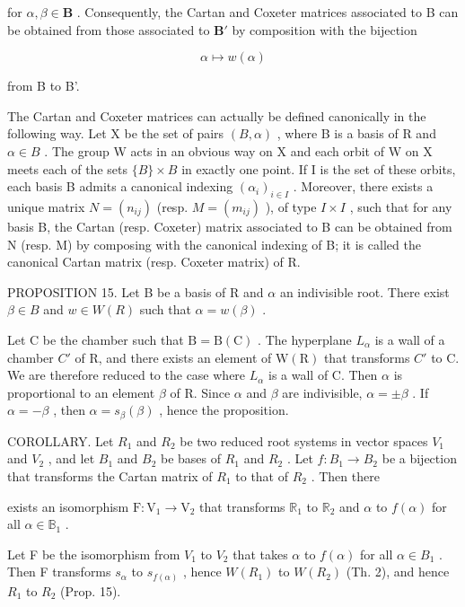 for \(\alpha, \beta \in \mathbf{B}\) . Consequently, the Cartan and Coxeter matrices associated to B can be obtained from those associated to \(\mathbf{B}'\) by composition with the bijection

\[
\alpha \mapsto w (\alpha)
\]

from B to B'.

The Cartan and Coxeter matrices can actually be defined canonically in the following way. Let X be the set of pairs \((B, \alpha)\) , where B is a basis of R and \(\alpha \in B\) . The group W acts in an obvious way on X and each orbit of W on X meets each of the sets \(\{B\} \times B\) in exactly one point. If I is the set of these orbits, each basis B admits a canonical indexing \((\alpha_{i})_{i \in I}\) . Moreover, there exists a unique matrix \(N = (n_{ij})\) (resp. \(M = (m_{ij})\) ), of type \(I \times I\) , such that for any basis B, the Cartan (resp. Coxeter) matrix associated to B can be obtained from N (resp. M) by composing with the canonical indexing of B; it is called the canonical Cartan matrix (resp. Coxeter matrix) of R.

PROPOSITION 15. Let B be a basis of R and \(\alpha\) an indivisible root. There exist \(\beta \in B\) and \(w \in W(R)\) such that \(\alpha = w(\beta)\) .

Let C be the chamber such that \(\mathrm{B} = \mathrm{B}(\mathrm{C})\) . The hyperplane \(L_{\alpha}\) is a wall of a chamber \(C'\) of R, and there exists an element of \(\mathrm{W}(\mathrm{R})\) that transforms \(C'\) to C. We are therefore reduced to the case where \(L_{\alpha}\) is a wall of C. Then \(\alpha\) is proportional to an element \(\beta\) of R. Since \(\alpha\) and \(\beta\) are indivisible, \(\alpha = \pm\beta\) . If \(\alpha = -\beta\) , then \(\alpha = s_{\beta}(\beta)\) , hence the proposition.

COROLLARY. Let \(R_{1}\) and \(R_{2}\) be two reduced root systems in vector spaces \(V_{1}\) and \(V_{2}\) , and let \(B_{1}\) and \(B_{2}\) be bases of \(R_{1}\) and \(R_{2}\) . Let \(f: B_{1} \to B_{2}\) be a bijection that transforms the Cartan matrix of \(R_{1}\) to that of \(R_{2}\) . Then there

exists an isomorphism \(\mathrm{F}: \mathrm{V}_1 \to \mathrm{V}_2\) that transforms \(\mathbb{R}_1\) to \(\mathbb{R}_2\) and \(\alpha\) to \(f(\alpha)\) for all \(\alpha \in \mathbb{B}_1\) .

Let F be the isomorphism from \(V_{1}\) to \(V_{2}\) that takes \(\alpha\) to \(f(\alpha)\) for all \(\alpha \in B_{1}\) . Then F transforms \(s_{\alpha}\) to \(s_{f(\alpha)}\) , hence \(W(R_{1})\) to \(W(R_{2})\) (Th. 2), and hence \(R_{1}\) to \(R_{2}\) (Prop. 15).

